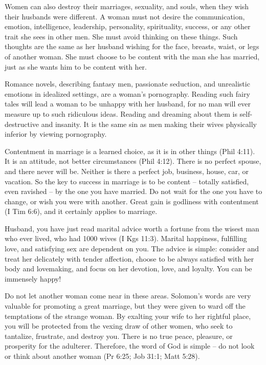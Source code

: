 Women can also destroy their marriages, sexuality, and souls, when they wish their husbands were different. A woman must not desire the communication, emotion, intelligence, leadership, personality, spirituality, success, or any other trait she sees in other men. She must avoid thinking on these things. Such thoughts are the same as her husband wishing for the face, breasts, waist, or legs of another woman. She must choose to be content with the man she has married, just as she wants him to be content with her.

Romance novels, describing fantasy men, passionate seduction, and unrealistic emotions in idealized settings, are a woman’s pornography. Reading such fairy tales will lead a woman to be unhappy with her husband, for no man will ever measure up to such ridiculous ideas. Reading and dreaming about them is self-destructive and insanity. It is the same sin as men making their wives physically inferior by viewing pornography.

Contentment in marriage is a learned choice, as it is in other things (Phil 4:11). It is an attitude, not better circumstances (Phil 4:12). There is no perfect spouse, and there never will be. Neither is there a perfect job, business, house, car, or vacation. So the key to success in marriage is to be content – totally satisfied, even ravished – by the one you have married. Do not wait for the one you have to change, or wish you were with another. Great gain is godliness with contentment (I Tim 6:6), and it certainly applies to marriage.

Husband, you have just read marital advice worth a fortune from the wisest man who ever lived, who had 1000 wives (I Kgs 11:3). Marital happiness, fulfilling love, and satisfying sex are dependent on you. The advice is simple: consider and treat her delicately with tender affection, choose to be always satisfied with her body and lovemaking, and focus on her devotion, love, and loyalty. You can be immensely happy!

Do not let another woman come near in these areas. Solomon’s words are very valuable for promoting a great marriage, but they were given to ward off the temptations of the strange woman. By exalting your wife to her rightful place, you will be protected from the vexing draw of other women, who seek to tantalize, frustrate, and destroy you. There is no true peace, pleasure, or prosperity for the adulterer. Therefore, the word of God is simple – do not look or think about another woman (Pr 6:25; Job 31:1; Matt 5:28).

